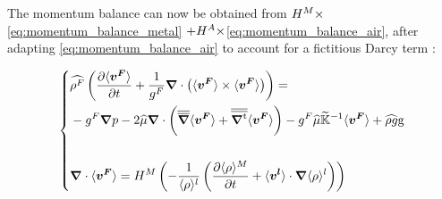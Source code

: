 The momentum balance can now be obtained from $H^M \times$\cref{eq:momentum_balance_metal} $+H^A \times$\cref{eq:momentum_balance_air}, after adapting \cref{eq:momentum_balance_air} to account for a fictitious Darcy term :

\begin{equation}
\label{eq:monolithic_momentum}
   \left\{
   \begin{aligned}
      & \mix{\rho^F} \brac{\tempup{ \vitf } + \frac{1}{\gf} \nabvec \cdot \brac{\vitf \times \vitf}} = \\
	  &- \gf\nabvec p - 2 \mix{\mu} \nabvec \cdot \brac{\nabmat \vitf+ \nabmattransp \vitf}
	  - \gf \mix{\mu} \Kmodif^{-1} \vitf + \mix{\rho g} \gravity\\ \\
      & \nabvec \cdot \vitf = \heavisideM \brac{-\frac{1}{\rhol} \brac{\tempup{\avg{\rho}^M }+ \vit \cdot  \nabvec \rhol}}
    \end{aligned}
    \right.
\end{equation}

